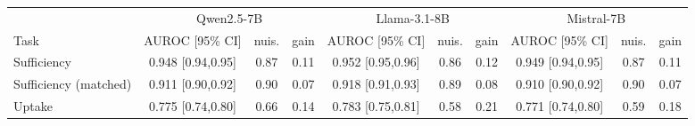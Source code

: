 \begin{tabular}{lccccccccc}
\toprule
& \multicolumn{3}{c}{Qwen2.5-7B} & \multicolumn{3}{c}{Llama-3.1-8B} & \multicolumn{3}{c}{Mistral-7B} \\
\cmidrule(lr){2-4}\cmidrule(lr){5-7}\cmidrule(lr){8-10}
Task & AUROC [95\% CI] & nuis. & gain & AUROC [95\% CI] & nuis. & gain & AUROC [95\% CI] & nuis. & gain \\
\midrule
Sufficiency & 0.948 [0.94,0.95] & 0.87 & 0.11 & 0.952 [0.95,0.96] & 0.86 & 0.12 & 0.949 [0.94,0.95] & 0.87 & 0.11 \\
Sufficiency (matched) & 0.911 [0.90,0.92] & 0.90 & 0.07 & 0.918 [0.91,0.93] & 0.89 & 0.08 & 0.910 [0.90,0.92] & 0.90 & 0.07 \\
Uptake & 0.775 [0.74,0.80] & 0.66 & 0.14 & 0.783 [0.75,0.81] & 0.58 & 0.21 & 0.771 [0.74,0.80] & 0.59 & 0.18 \\
\bottomrule
\end{tabular}
